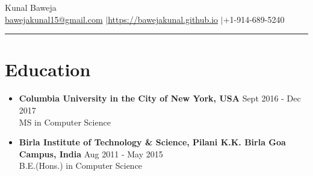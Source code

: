 \documentclass{article}
\def\name{Kunal Baweja}
\begin{document}
\begin{center}
{\huge \name}\\
\href{mailto:bawejakunal15@gmail.com}{bawejakunal15@gmail.com} $|$\hspace{3pt}\href{https://bawejakunal.github.io}{https://bawejakunal.github.io} $|$\hspace{3pt}+1-914-689-5240
\end{center}

\hrule
\vspace{5pt}

\vspace{-1mm}
\section*{Education}
\begin{itemize}

    \item \textbf{Columbia University in the City of New York, USA} {\hfill Sept 2016 - Dec 2017}\\
    MS in Computer Science
    
    \item \textbf{Birla Institute of Technology \& Science, Pilani K.K. Birla Goa Campus, India} {\hfill Aug 2011 - May 2015}\\
    B.E.(Hons.) in Computer Science

\end{itemize}

\vspace{-2mm}
\end{document}
